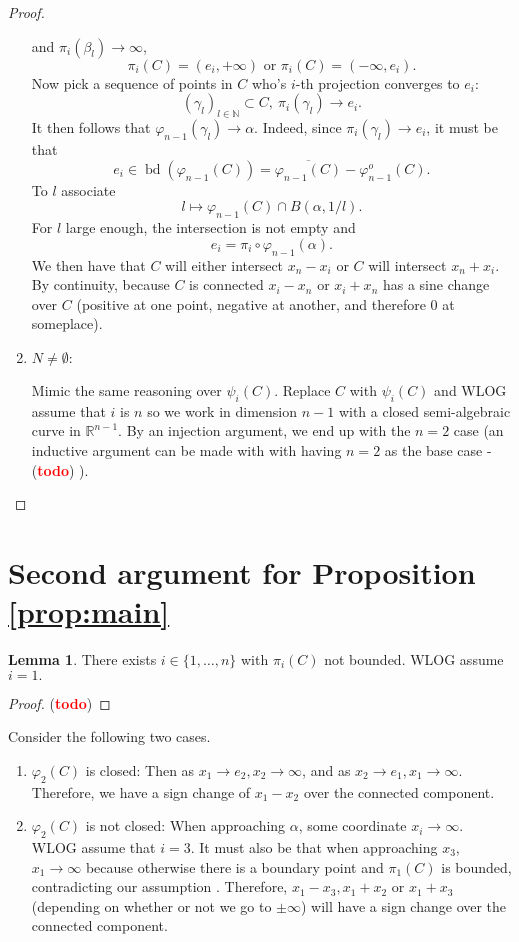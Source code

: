 \documentclass[11pt]{article}
\theoremstyle{definition}
\newtheorem{lemma}{Lemma}
\newcommand{\N}{\mathbb{N}}
\newcommand{\R}{\mathbb{R}}
\newcommand{\vp}{\varphi}
\def\td{(\textcolor{red}{{\bf todo}})}
\DeclareMathOperator{\bd}{bd}
\def\td{(\textcolor{red}{{\bf todo}}) }
\begin{document}
\begin{proof}
\begin{enumerate}
and $\pi_i(\beta_l) \rightarrow \infty$,
\[
\pi_i(C) = (e_i,+\infty) \textrm{ or } \pi_i(C) = (-\infty,e_i). 
\]
Now pick a sequence of points in $C$ who's $i$-th projection converges to $e_i:$ 
\[
(\gamma_l)_{l \in \N} \subset C,~ \pi_i(\gamma_l) \rightarrow e_i.
\]
It then follows that $\vp_{n-1}(\gamma_l) \rightarrow \alpha$. Indeed, since $\pi_i(\gamma_l) \rightarrow e_i$, it must be that 
\[
e_i \in \bd(\vp_{n-1}(C)) = \overline{\vp_{n-1}(C)} - \vp_{n-1}^o(C).
\]
To $l$ associate 
\[
l \mapsto \vp_{n-1}(C) \cap B(\alpha,1/l).
\]
For $l$ large enough, the intersection is not empty and
\[
e_i =\pi_i\circ \vp_{n-1}(\alpha).
\]
We then have that $C$ will either intersect $x_n-x_i$ or $C$ will intersect $x_n+x_i$. By continuity, because $C$ is connected $x_i - x_n$ or $x_i+x_n$ has a sine change over $C$ (positive at one point, negative at another, and therefore 0 at someplace). 
%
\item $N \not = \emptyset:$
\par 
Mimic the same reasoning over $\psi_i(C)$. Replace $C$ with $\psi_i(C)$ and WLOG assume that $i$ is $n$ so we work in dimension $n-1$ with a closed semi-algebraic curve in $\R^{n-1}$. By an injection argument, we end up with the $n=2$ case (an inductive argument can be made with with having $n=2$ as the base case - \td).  
\end{enumerate}


\end{proof}



\section*{Second argument for Proposition \ref{prop:main}}
\begin{lemma}
    There exists $i \in \{1,\hdots,n\}$ with $\pi_i(C)$ not bounded. WLOG assume $i=1.$
\end{lemma}
\begin{proof}
    \td
\end{proof}
\noindent 
Consider the following two cases. 
\begin{enumerate}
    \item $\vp_2(C)$ is closed:
\newline 
Then as $x_1 \rightarrow e_2, x_2 \rightarrow \infty$, and as  $x_2 \rightarrow e_1, x_1 \rightarrow \infty$. Therefore, we have a sign change of $x_1-x_2$ over the connected component. 
    \item $\vp_2(C)$ is not closed:
\newline 
When approaching $\alpha$, some coordinate $x_i \rightarrow \infty.$ WLOG assume that $i=3.$ It must also be that when approaching $x_3$, $x_1 \rightarrow \infty$ because otherwise there is a boundary point and $\pi_1(C)$ is bounded, contradicting our assumption \lightning. Therefore, $x_1-x_3, x_1+x_2$ or $x_1+x_3$ (depending on whether or not we go to $\pm \infty$) will have a sign change over the connected component.
\end{enumerate}
\end{document}
